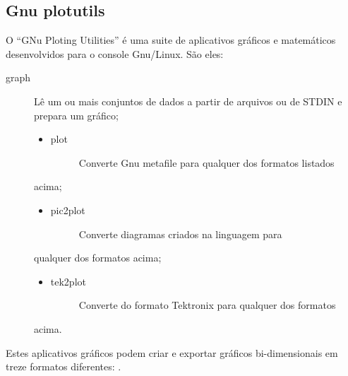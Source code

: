 \documentclass[a4paper,10pt,portuguese]{sphinxmanual}
\begin{document}
\subsection{Gnu plotutils}
\label{bash:gnu-plotutils}
O ``GNu Ploting Utilities'' é uma suite de aplicativos gráficos e
matemáticos desenvolvidos para o console Gnu/Linux. São eles:
\begin{description}
\item[{graph}] \leavevmode
Lê um ou mais conjuntos de dados a partir de arquivos ou de STDIN e
prepara um gráfico;
\begin{itemize}
\item {} \begin{description}
\item[{plot}] \leavevmode
Converte Gnu metafile para qualquer dos formatos listados

\end{description}

\end{itemize}

acima;
\begin{itemize}
\item {} \begin{description}
\item[{pic2plot}] \leavevmode
Converte diagramas criados na linguagem  para

\end{description}

\end{itemize}

qualquer dos formatos acima;
\begin{itemize}
\item {} \begin{description}
\item[{tek2plot}] \leavevmode
Converte do formato Tektronix para qualquer dos formatos

\end{description}

\end{itemize}

acima.

\end{description}

Estes aplicativos gráficos podem criar e exportar gráficos
bi-dimensionais em treze formatos diferentes:
.
\end{document}
